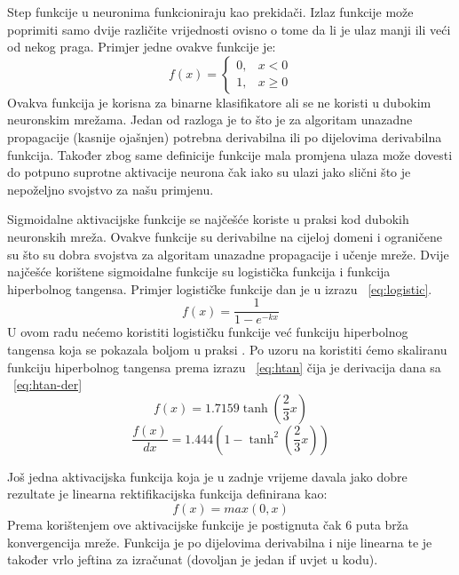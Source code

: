 \documentclass[times, utf8, zavrsni, numeric]{fer}
\begin{document}
Step funkcije u neuronima funkcioniraju kao prekidači. Izlaz funkcije može poprimiti samo dvije različite vrijednosti ovisno o tome da li je ulaz manji ili veći od nekog praga. Primjer jedne ovakve funkcije je:
\begin{equation}
  f(x) = \begin{cases}
    0, & \text{$x<0$}\\
    1, & \text{$x\geq0$}
  \end{cases}
\end{equation}
Ovakva funkcija je korisna za binarne klasifikatore ali se ne koristi u dubokim neuronskim mrežama. Jedan od razloga je to što je za algoritam unazadne propagacije (kasnije ojašnjen) potrebna derivabilna ili po dijelovima derivabilna funkcija. Također zbog same definicije funkcije mala promjena ulaza može dovesti do potpuno suprotne aktivacije neurona čak iako su ulazi jako slični što je nepoželjno svojstvo za našu primjenu.

Sigmoidalne aktivacijske funkcije se najčešće koriste u praksi kod dubokih neuronskih mreža. Ovakve funkcije su derivabilne na cijeloj domeni i ograničene su što su dobra svojstva za algoritam unazadne propagacije i učenje mreže. Dvije najčešće korištene sigmoidalne funkcije su logistička funkcija i funkcija hiperbolnog tangensa. Primjer logističke funkcije dan je u izrazu ~\ref{eq:logistic}. 
\begin{equation}\label{eq:logistic}
f(x) = \frac{1}{1-e^{-kx}}
\end{equation}
U ovom radu nećemo koristiti logističku funkcije već funkciju hiperbolnog tangensa koja se pokazala boljom u praksi \citep{lecun1998gradient}. Po uzoru na \citep{lecun1998gradient} koristiti ćemo skaliranu funkciju hiperbolnog tangensa prema izrazu ~\ref{eq:htan} čija je derivacija dana sa ~\ref{eq:htan-der}
\begin{equation}\label{eq:htan}
f(x) = 1.7159\tanh\left(\frac{2}{3}x\right)
\end{equation}
\begin{equation}\label{eq:htan-der}
\dfrac{f(x)}{dx} = 1.444\left(1-\tanh^2\left(\frac{2}{3}x\right)\right)
\end{equation}

Još jedna aktivacijska funkcija koja je u zadnje vrijeme davala jako dobre rezultate je linearna rektifikacijska funkcija definirana kao:
\begin{equation}\label{eq:relu}
f(x) = max(0, x)
\end{equation}
Prema \citep{krizhevsky2012imagenet} korištenjem ove aktivacijske funkcije je postignuta čak 6 puta brža konvergencija mreže. Funkcija je po dijelovima derivabilna i nije linearna te je također vrlo jeftina za izračunat (dovoljan je jedan if uvjet u kodu).
\end{document}
